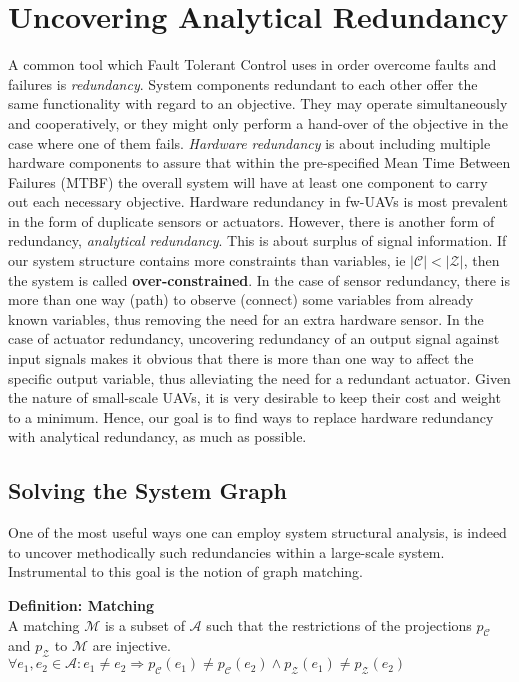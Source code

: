 \chapter{Uncovering Analytical Redundancy}

A common tool which Fault Tolerant Control uses in order overcome faults and failures is \textit{redundancy}. System components redundant to each other offer the same functionality with regard to an objective. They may operate simultaneously and cooperatively, or they might only perform a hand-over of the objective in the case where one of them fails. \textit{Hardware redundancy} is about including multiple hardware components to assure that within the pre-specified Mean Time Between Failures (MTBF) the overall system will have at least one component to carry out each necessary objective. Hardware redundancy in fw-UAVs is most prevalent in the form of duplicate sensors or actuators.
However, there is another form of redundancy, \textit{analytical redundancy}. This is about surplus of signal information. If our system structure contains more constraints than variables, ie $ |\mathcal{C}|<|\mathcal{Z}|$, then the system is called \textbf{over-constrained}. In the case of sensor redundancy, there is more than one way (path) to observe (connect) some variables from already known variables, thus removing the need for an extra hardware sensor. In the case of actuator redundancy, uncovering redundancy of an output signal against input signals makes it obvious that there is more than one way to affect the specific output variable, thus alleviating the need for a redundant actuator.
Given the nature of small-scale UAVs, it is very desirable to keep their cost and weight to a minimum. Hence, our goal is to find ways to replace hardware redundancy with analytical redundancy, as much as possible.

\section{Solving the System Graph}

One of the most useful ways one can employ system structural analysis, is indeed to uncover methodically such redundancies within a large-scale system. Instrumental to this goal is the notion of graph matching.

\textbf{Definition: Matching}\\
A matching $\mathcal{M}$ is a subset of $\mathcal{A}$ such that the restrictions of the projections $p_\mathcal{C}$ and $p_\mathcal{Z}$ to $\mathcal{M}$ are injective.\\
\begin{math}
\forall e_1,e_2 \in \mathcal{A} : e_1 \neq e_2 \Rightarrow p_\mathcal{C}(e_1) \neq p_\mathcal{C}(e_2) \wedge p_\mathcal{Z}(e_1) \neq p_\mathcal{Z}(e_2)
\end{math}

